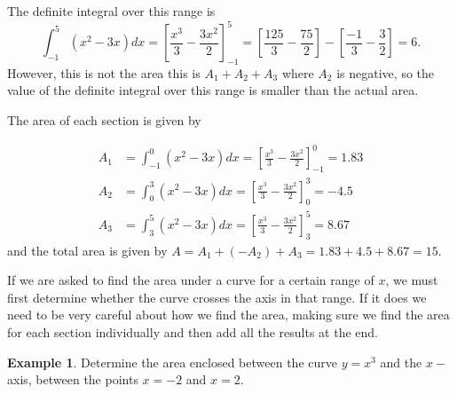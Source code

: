 \documentclass[
  11pt,
  oneside]{book}
\newcommand{\slide}{}
\theoremstyle{definition}
\theoremstyle{definition}
\newtheorem{example}{Example}[chapter]
\theoremstyle{definition}
\theoremstyle{definition}
\theoremstyle{remark}
\begin{document}
The definite integral over this range is
\[
\int_{-1}^5(x^2-3x)dx = \left[\frac{x^3}3-\frac{3x^2}2\right]_{-1}^5 = \left[\frac{125}3-\frac{75}2\right]-\left[\frac{-1}3-\frac{3}2\right]=6.
\]
However, this is not the area this is \(A_1 + A_2 + A_3\) where \(A_2\) is negative, so the value of the definite integral over this range is smaller than the actual area.

The area of each section is given by

\begin{align*}
A_1&=\int_{-1}^0(x^2-3x)dx = \left[\frac{x^3}3-\frac{3x^2}2\right]_{-1}^0 = 1.83\\
A_2&=\int_{0}^3(x^2-3x)dx = \left[\frac{x^3}3-\frac{3x^2}2\right]_{0}^3 = -4.5\\
A_3&=\int_{3}^5(x^2-3x)dx = \left[\frac{x^3}3-\frac{3x^2}2\right]_{3}^5 = 8.67
\end{align*}
and the total area is given by \(A = A_1 + (-A_2) + A_3 = 1.83 + 4.5 + 8.67 = 15\).

If we are asked to find the area under a curve for a certain range of \(x\), we must first determine whether the curve crosses the axis in that range. If it does we need to be very careful about how we find the area, making sure we find the area for each section individually and then add all the results at the end.

\slide

\begin{example}
Determine the area enclosed between the curve \(y=x^3\) and the \(x-\)axis, between the points \(x=-2\) and \(x=2\).
\end{example}
\end{document}
